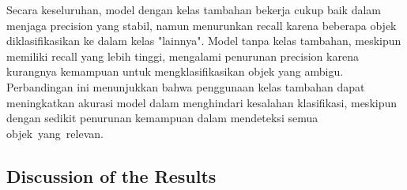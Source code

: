\documentclass[12pt,a4paper]{article}
\begin{document}
\begin{adjustwidth}{3em}{0pt}
\hspace{0.5cm}Secara keseluruhan, model dengan kelas tambahan bekerja cukup baik dalam menjaga precision yang stabil, namun menurunkan recall karena beberapa objek diklasifikasikan ke dalam kelas "lainnya". Model tanpa kelas tambahan, meskipun memiliki recall yang lebih tinggi, mengalami penurunan precision karena kurangnya kemampuan untuk mengklasifikasikan objek yang ambigu. Perbandingan ini menunjukkan bahwa penggunaan kelas tambahan dapat meningkatkan akurasi model dalam menghindari kesalahan klasifikasi, meskipun dengan sedikit penurunan kemampuan dalam mendeteksi semua objek yang relevan.
\end{adjustwidth}

\subsection{Discussion of the Results}
\end{document}

